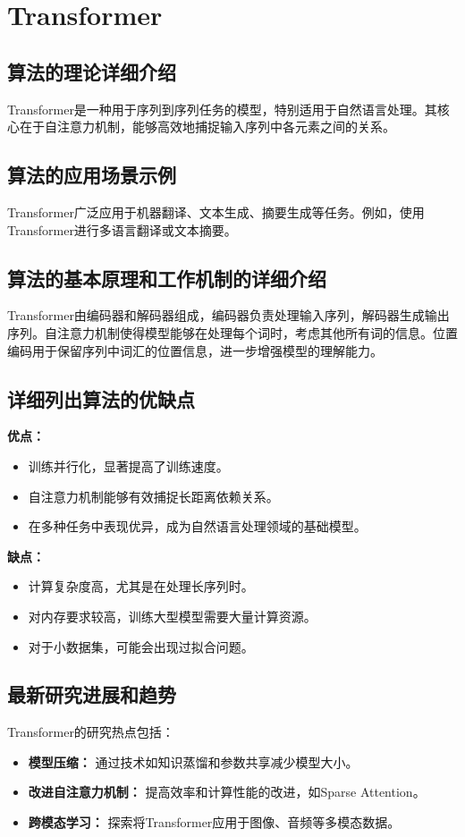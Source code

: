 \section{Transformer}
\subsection*{算法的理论详细介绍}
Transformer是一种用于序列到序列任务的模型，特别适用于自然语言处理。其核心在于自注意力机制，能够高效地捕捉输入序列中各元素之间的关系。

\subsection*{算法的应用场景示例}
Transformer广泛应用于机器翻译、文本生成、摘要生成等任务。例如，使用Transformer进行多语言翻译或文本摘要。

\subsection*{算法的基本原理和工作机制的详细介绍}
Transformer由编码器和解码器组成，编码器负责处理输入序列，解码器生成输出序列。自注意力机制使得模型能够在处理每个词时，考虑其他所有词的信息。位置编码用于保留序列中词汇的位置信息，进一步增强模型的理解能力。

\subsection*{详细列出算法的优缺点}
\textbf{优点：}
\begin{itemize}
    \item 训练并行化，显著提高了训练速度。
    \item 自注意力机制能够有效捕捉长距离依赖关系。
    \item 在多种任务中表现优异，成为自然语言处理领域的基础模型。
\end{itemize}

\textbf{缺点：}
\begin{itemize}
    \item 计算复杂度高，尤其是在处理长序列时。
    \item 对内存要求较高，训练大型模型需要大量计算资源。
    \item 对于小数据集，可能会出现过拟合问题。
\end{itemize}

\subsection*{最新研究进展和趋势}
Transformer的研究热点包括：
\begin{itemize}
    \item \textbf{模型压缩：} 通过技术如知识蒸馏和参数共享减少模型大小。
    \item \textbf{改进自注意力机制：} 提高效率和计算性能的改进，如Sparse Attention。
    \item \textbf{跨模态学习：} 探索将Transformer应用于图像、音频等多模态数据。
\end{itemize}
